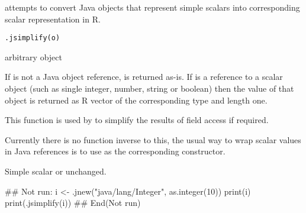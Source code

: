 \begin{Description}\relax
{} attempts to convert Java objects that represent
simple scalars into corresponding scalar representation in R.
\end{Description}
\begin{Usage}
\begin{verbatim}
.jsimplify(o)
\end{verbatim}
\end{Usage}
\begin{Arguments}
\begin{ldescription}
\item[\code{o}] arbitrary object
\end{ldescription}
\end{Arguments}
\begin{Details}\relax
If  is not a Java object reference,  is returned
as-is. If  is a reference to a scalar object (such as single
integer, number, string or boolean) then the value of that object is
returned as R vector of the corresponding type and length one.

This function is used by  to simplify the results
of field access if required.

Currently there is no function inverse to this, the usual way to wrap
scalar values in Java references is to use  as the
corresponding constructor.
\end{Details}
\begin{Value}
Simple scalar or  unchanged.
\end{Value}
\begin{SeeAlso}\relax
{}
\end{SeeAlso}
\begin{Examples}
\begin{ExampleCode}
## Not run: 
i <- .jnew("java/lang/Integer", as.integer(10))
print(i)
print(.jsimplify(i))
## End(Not run)
\end{ExampleCode}
\end{Examples}

